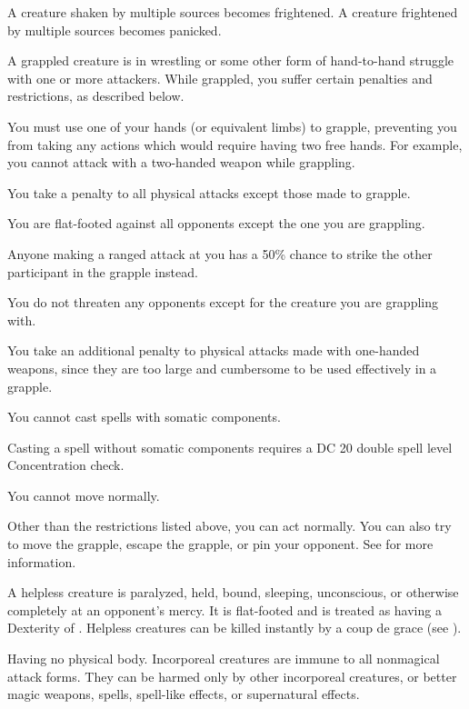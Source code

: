 A creature shaken by multiple sources becomes frightened. A creature frightened by multiple sources becomes panicked.

 A grappled creature is in wrestling or some other form of hand-to-hand struggle with one or more attackers. While grappled, you suffer certain penalties and restrictions, as described below.
\begin{itemize*}
\item You must use one of your hands (or equivalent limbs) to grapple, preventing you from taking any actions which would require having two free hands. For example, you cannot attack with a two-handed weapon while grappling.
\item You take a  penalty to all physical attacks except those made to grapple.
\item You are flat-footed against all opponents except the one you are grappling.
\item Anyone making a ranged attack at you has a 50\% chance to strike the other participant in the grapple instead.
\item You do not threaten any opponents except for the creature you are grappling with.
\item You take an additional  penalty to physical attacks made with one-handed weapons, since they are too large and cumbersome to be used effectively in a grapple.
\item You cannot cast spells with somatic components.
\item Casting a spell without somatic components requires a DC 20 \add double spell level Concentration check.
\item You cannot move normally.
\end{itemize*}
Other than the restrictions listed above, you can act normally. You can also try to move the grapple, escape the grapple, or pin your opponent. See  for more information.

 A helpless creature is paralyzed, held, bound, sleeping, unconscious, or otherwise completely at an opponent's mercy. It is flat-footed and is treated as having a Dexterity of . Helpless creatures can be killed instantly by a coup de grace (see ).

 Having no physical body. Incorporeal creatures are immune to all nonmagical attack forms. They can be harmed only by other incorporeal creatures,  or better magic weapons, spells, spell-like effects, or supernatural effects.

